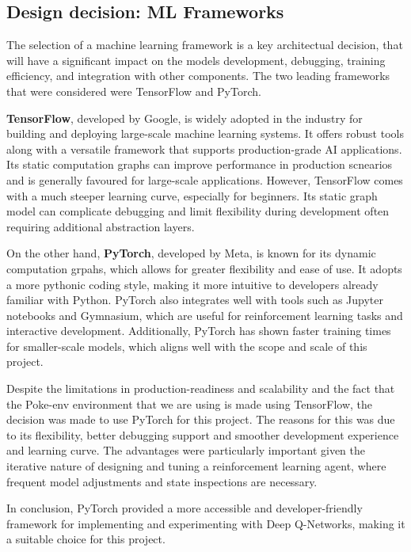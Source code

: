 \subsection{Design decision: ML Frameworks}
The selection of a machine learning framework is a key architectual decision, that
will have a significant impact on the models development, debugging, training efficiency,
and integration with other components. The two leading frameworks that were considered were
TensorFlow and PyTorch. 

\textbf{TensorFlow}, developed by Google, is widely adopted in the industry for building 
and deploying large-scale machine learning systems. It offers robust tools along with
a versatile framework that supports production-grade AI applications. Its static computation
graphs can improve performance in production scnearios and is generally favoured for 
large-scale applications. However, TensorFlow comes with a much steeper learning curve,
especially for beginners. Its static graph model can complicate debugging and 
limit flexibility during development often requiring additional abstraction layers.

On the other hand, \textbf{PyTorch}, developed by Meta, is known for its dynamic
computation grpahs, which allows for greater flexibility and ease of use. It adopts a
more pythonic coding style, making it more intuitive to developers already familiar with
Python. PyTorch also integrates well with tools such as Jupyter notebooks and Gymnasium,
which are useful for reinforcement learning tasks and interactive development. Additionally,
PyTorch has shown faster training times for smaller-scale models, which aligns well with
the scope and scale of this project.

Despite the limitations in production-readiness and scalability and the fact that the
Poke-env environment that we are using is made using TensorFlow, the decision was made
to use PyTorch for this project. The reasons for this was due to its flexibility, better
debugging support and smoother development experience and learning curve. The advantages
were particularly important given the iterative nature of designing and tuning a reinforcement learning
agent, where frequent model adjustments and state inspections are necessary. 

In conclusion, PyTorch provided a more accessible and developer-friendly framework for
implementing and experimenting with Deep Q-Networks, making it a suitable choice for this project.



